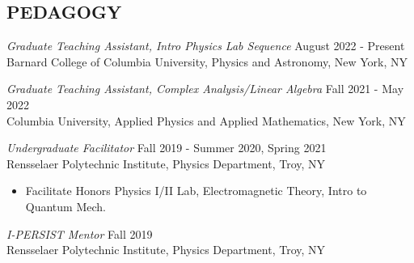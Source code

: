 \documentclass[margin]{rpires}
\begin{document}
\begin{resume}
\section{PEDAGOGY}
    
    \textit{Graduate Teaching Assistant, Intro Physics Lab Sequence} \hfill August 2022 - Present \\
    Barnard College of Columbia University, Physics and Astronomy, New York, NY

    \textit{Graduate Teaching Assistant, Complex Analysis/Linear Algebra} \hfill Fall 2021 - May 2022 \\
    Columbia University, Applied Physics and Applied Mathematics, New York, NY


    \textit{Undergraduate Facilitator} \hfill Fall 2019 - Summer 2020, Spring 2021 \\
    Rensselaer Polytechnic Institute, Physics Department, Troy, NY
    \begin{itemize}  \itemsep -2pt %
        \item Facilitate Honors Physics I/II Lab, Electromagnetic Theory, Intro to Quantum Mech.
    \end{itemize}

    \textit{I-PERSIST Mentor} \hfill Fall 2019 \\
    Rensselaer Polytechnic Institute, Physics Department, Troy, NY


\end{resume}
\end{document}
